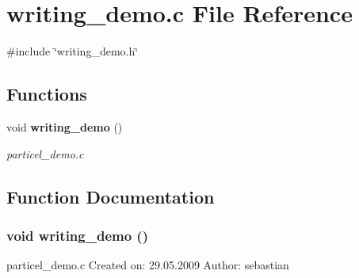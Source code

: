\section{writing\_\-demo.c File Reference}
\label{writing__demo_8c}
{\ttfamily \#include \char`\"{}writing\_\-demo.h\char`\"{}}\par
\subsection*{Functions}
\begin{DoxyCompactItemize}
\item 
void {\bf writing\_\-demo} ()
\begin{DoxyCompactList}\small\item\em particel\_\-demo.c \item\end{DoxyCompactList}\end{DoxyCompactItemize}


\subsection{Function Documentation}
\subsubsection[{writing\_\-demo}]{\setlength{\rightskip}{0pt plus 5cm}void writing\_\-demo ()}\label{writing__demo_8c_abdd925f1d9c8a09b9950c059c51e02d1}


particel\_\-demo.c Created on: 29.05.2009 Author: sebastian 
